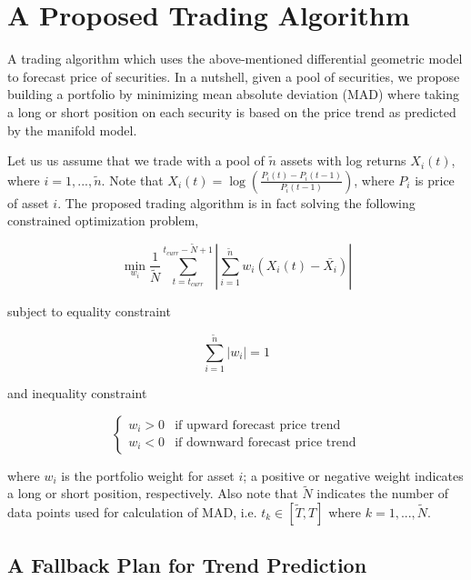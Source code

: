 \documentclass{article}
\begin{document}
\section{A Proposed Trading Algorithm}\label{section:trading-algorithm}

A trading algorithm which uses the above-mentioned differential
geometric model to forecast price of securities. In a nutshell, given
a pool of securities, we propose building a portfolio by minimizing
mean absolute deviation (MAD) where taking a long or short position on
each security is based on the price trend as predicted by the manifold
model.

Let us us assume that we trade with a pool of $\tilde{n}$ assets with
log returns $X_{i}(t)$, where $i = 1, ...,\tilde{n}$. Note that
$X_{i}(t) = \log(\frac{P_{i}(t) - P_{i}(t-1)}{P_{i}(t-1)})$, where
$P_{i}$ is price of asset $i$. The proposed trading algorithm is in
fact solving the following constrained optimization problem,

\begin{equation}\label{eqn:mad-optimization-problem}
\min_{w_{i}} \frac{1}{\tilde{N}}\sum_{t=t_{curr}}^{t_{curr}-\tilde{N}+1}
|\sum_{i=1}^{\tilde{n}} w_{i} (X_{i}(t)-\bar{X_{i}})|
\end{equation}

subject to equality constraint

\begin{equation}\label{eqn:mad-sum-constraint}
\sum_{i=1}^{\tilde{n}} |w_{i}| = 1
\end{equation}

and inequality constraint

\[
\begin{cases}\label{eqn:mad-trend-constraint}
    w_{i} > 0 & \text{if upward forecast price trend} \\
    w_{i} < 0 & \text{if downward forecast price trend}
\end{cases}
\]

where $w_{i}$ is the portfolio weight for asset $i$; a positive or
negative weight indicates a long or short position, respectively. Also
note that $\tilde{N}$ indicates the number of data points used for
calculation of MAD, i.e. $t_{k} \in [\tilde{T},T]$ where $k = 1,
...,\tilde{N}$.

\subsection{A Fallback Plan for Trend Prediction}\label{subsection:fallback-macd}
\end{document}
